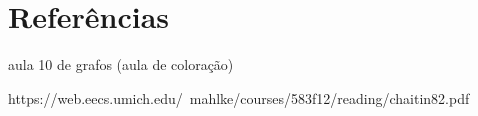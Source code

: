 \section{Referências}

aula 10 de grafos (aula de coloração)

https://web.eecs.umich.edu/~mahlke/courses/583f12/reading/chaitin82.pdf
